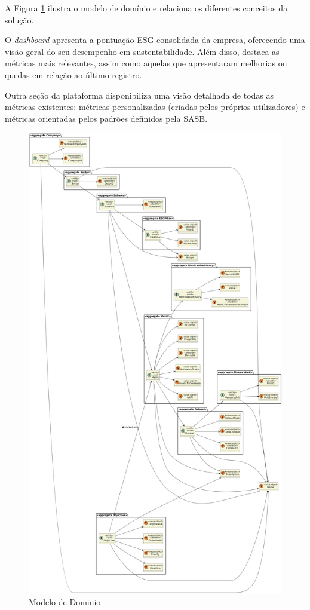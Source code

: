A Figura \ref{fig:domain_model} ilustra o modelo de domínio e relaciona os diferentes conceitos da solução.

O \textit{dashboard} apresenta a pontuação ESG consolidada da empresa, oferecendo uma visão geral do seu desempenho em sustentabilidade. Além disso, destaca as métricas mais relevantes, assim como aquelas que apresentaram melhorias ou quedas em relação ao último registro.

Outra seção da plataforma disponibiliza uma visão detalhada de todas as métricas existentes: métricas personalizadas (criadas pelos próprios utilizadores) e métricas orientadas pelos padrões definidos pela \gls{SASB}.

\begin{figure}[H]
    \centering
    \includegraphics[width=5in,keepaspectratio]{frontmatter/assets/diagrams/Domain Model/Domain_Model.png}
    \caption{Modelo de Dominio}
    \label{fig:domain_model}
\end{figure}

